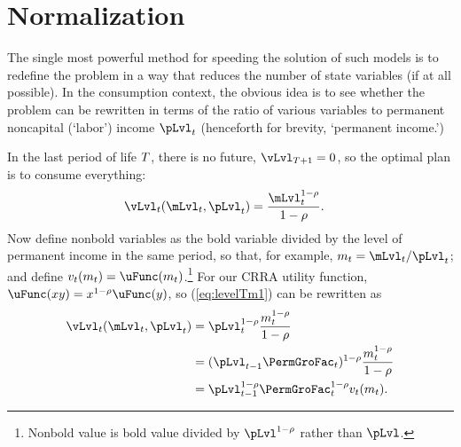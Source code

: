 \hypertarget{normalization}{}
\section{Normalization}\label{sec:normalization}

The single most powerful method for speeding the solution of such models is to redefine the problem in a way that reduces the number of state variables (if at all possible).  In the consumption context, the obvious idea is to see whether the problem can be rewritten in terms of the ratio of various variables to permanent noncapital (`labor') income $\pLvl_{\prd}$ (henceforth for brevity, `permanent income.')

In the last {period} of life $T$, there is no future, $\vLvl_{\trmT+1} = 0$, so the optimal plan is to consume everything:
\begin{equation}\begin{gathered}\begin{aligned}
      \vLvl_{\prdT}(\mLvl_{\prdT},\pLvl_{\prdT})  & = \frac{\mLvl_{\prdT}^{1-\CRRA}}{1-\CRRA}. \label{eq:levelTm1}
    \end{aligned}\end{gathered}\end{equation}
Now define nonbold variables as the bold variable divided by the level of permanent income in the same period, so that, for example, ${\mNrm}_{\prdT}=\mLvl_{\prdT}/\pLvl_{\prdT}$; and define $\vFunc_{\prdT}({\mNrm}_{\prdT}) = \uFunc({\mNrm}_{\prdT})$.\footnote{Nonbold value is bold value divided by $\pLvl^{1-\CRRA}$ rather than $\pLvl$.}  For our CRRA utility function, $\uFunc(xy)=x^{1-\CRRA}\uFunc(y)$, so (\ref{eq:levelTm1}) can be rewritten as
\begin{equation}\begin{gathered}\begin{aligned}
      \vLvl_{\prdT}(\mLvl_{\prdT},\pLvl_{\prdT}) & = \pLvl_{\prdT}^{1-\CRRA}\frac{{\mNrm}_{\prdT}^{1-\CRRA}}{1-\CRRA}                       \\
                                                & = (\pLvl_{\prdT-1}\PermGroFac_{\prdT})^{1-\CRRA}\frac{{\mNrm}_{\prdT}^{1-\CRRA}}{1-\CRRA} \\
                                                &= \pLvl_{\prdT-1}^{1-\CRRA}\PermGroFac_{\prdT}^{1-\CRRA}\vFunc_{\prdT}({\mNrm}_{\prdT}). \label{eq:vT}
    \end{aligned}\end{gathered}\end{equation}

